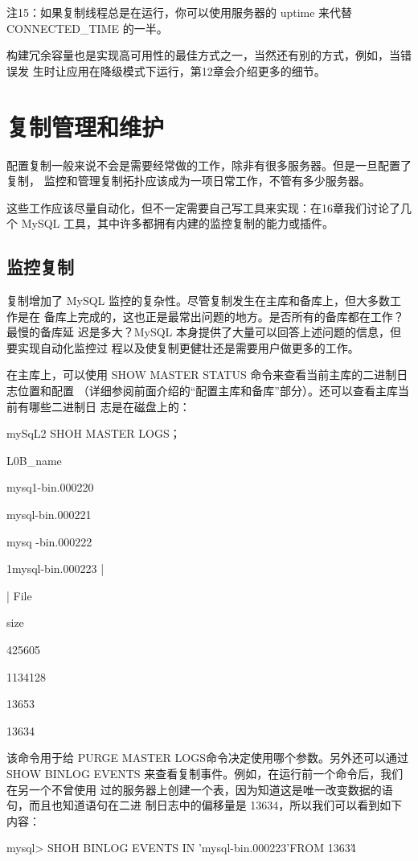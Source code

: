 注15：如果复制线程总是在运行，你可以使用服务器的 uptime 来代替 CONNECTED\_TIME 的一半。

构建冗余容量也是实现高可用性的最佳方式之一，当然还有别的方式，例如，当错误发
生时让应用在降级模式下运行，第12章会介绍更多的细节。

\section{复制管理和维护}
配置复制一般来说不会是需要经常做的工作，除非有很多服务器。但是一旦配置了复制，
监控和管理复制拓扑应该成为一项日常工作，不管有多少服务器。

这些工作应该尽量自动化，但不一定需要自己写工具来实现：在16章我们讨论了几个
MySQL 工具，其中许多都拥有内建的监控复制的能力或插件。

\subsection{监控复制}
复制增加了 MySQL 监控的复杂性。尽管复制发生在主库和备库上，但大多数工作是在
备库上完成的，这也正是最常出问题的地方。是否所有的备库都在工作？最慢的备库延
迟是多大？MySQL 本身提供了大量可以回答上述问题的信息，但要实现自动化监控过
程以及使复制更健壮还是需要用户做更多的工作。

在主库上，可以使用 SHOW MASTER STATUS 命令来查看当前主库的二进制日志位置和配置
（详细参阅前面介绍的“配置主库和备库”部分）。还可以查看主库当前有哪些二进制日
志是在磁盘上的：

mySqL2 SHOH MASTER LOGS；

L0B\_name

mysq1-bin.000220

mysql-bin.000221

mysq -bin.000222

1mysql-bin.000223 |

| File

size

425605

1134128

13653

13634

该命令用于给 PURGE MASTER LOGS命令决定使用哪个参数。另外还可以通过SHOW
BINLOG EVENTS 来查看复制事件。例如，在运行前一个命令后，我们在另一个不曾使用
过的服务器上创建一个表，因为知道这是唯一改变数据的语句，而且也知道语句在二进
制日志中的偏移量是 13634，所以我们可以看到如下内容：

mysql> SHOH BINLOG EVENTS IN 'mysql-bin.000223'FROM 13634\G

